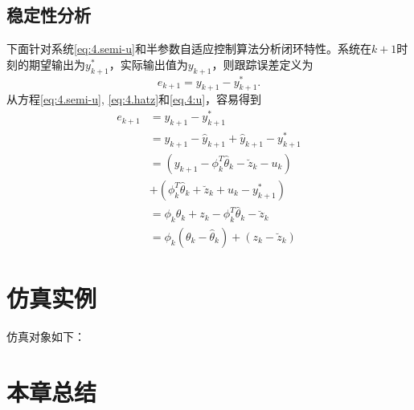 \subsection{稳定性分析}\label{sect:4.3.2}
下面针对系统\ref{eq:4.semi-u}和半参数自适应控制算法分析闭环特性。系统在$k+1$时刻的期望输出为$y^{*}_{k+1}$，实际输出值为$y_{k+1}$，则跟踪误差定义为
\begin{equation}
e_{k+1} = y_{k+1} - y^{*}_{k+1}.
\end{equation}
从方程\eqref{eq:4.semi-u}, \eqref{eq:4.hatz}和\eqref{eq.4:u}，容易得到
\begin{equation}\label{eq:4.stab}
\begin{split}%
e_{k+1} & = y_{k+1} - y^{*}_{k+1}\\
& = y_{k+1} - \hat{y}_{k+1} + \hat{y}_{k+1} - y^{*}_{k+1}\\
& = (y_{k+1} - \phi_{k}^{T}\hat{\theta}_{k} - \breve{z}_{k} - u_{k} )\\
& + (\phi_{k}^{T}\hat{\theta}_{k} + \breve{z}_{k} + u_{k}  - y^{*}_{k+1})\\
& = \phi_{k}\theta_{k} + z_{k} - \phi_{k}^{T}\hat{\theta}_{k} - \breve{z}_{k}\\
& = \phi_{k}(\theta_{k} - \hat{\theta}_{k}) + (z_{k} - \breve{z}_{k})
\end{split}
\end{equation}
\section{仿真实例}
仿真对象如下：

\section{本章总结}